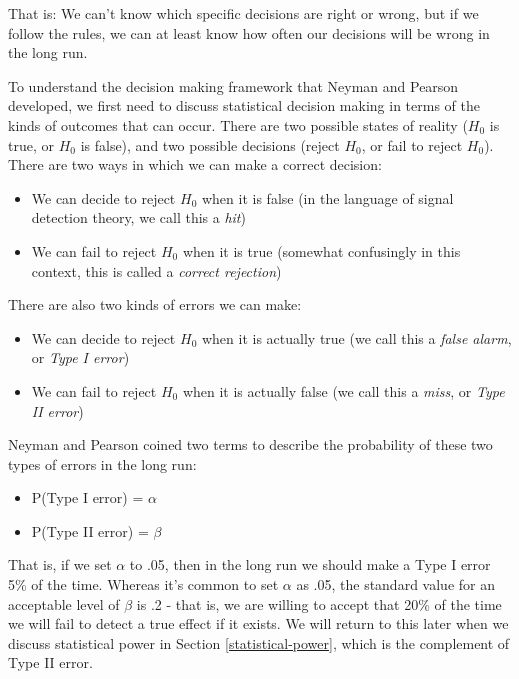 \documentclass[12pt,]{book}
\providecommand{\tightlist}{%
  \setlength{\itemsep}{0pt}\setlength{\parskip}{0pt}}
\theoremstyle{definition}
\theoremstyle{definition}
\theoremstyle{definition}
\theoremstyle{remark}
\begin{document}
That is: We can't know which specific decisions are right or wrong, but if we follow the rules, we can at least know how often our decisions will be wrong in the long run.

To understand the decision making framework that Neyman and Pearson developed, we first need to discuss statistical decision making in terms of the kinds of outcomes that can occur. There are two possible states of reality (\(H_0\) is true, or \(H_0\) is false), and two possible decisions (reject \(H_0\), or fail to reject \(H_0\)). There are two ways in which we can make a correct decision:

\begin{itemize}
\tightlist
\item
  We can decide to reject \(H_0\) when it is false (in the language of signal detection theory, we call this a \emph{hit})
\item
  We can fail to reject \(H_0\) when it is true (somewhat confusingly in this context, this is called a \emph{correct rejection})
\end{itemize}

There are also two kinds of errors we can make:

\begin{itemize}
\tightlist
\item
  We can decide to reject \(H_0\) when it is actually true (we call this a \emph{false alarm}, or \emph{Type I error})
\item
  We can fail to reject \(H_0\) when it is actually false (we call this a \emph{miss}, or \emph{Type II error})
\end{itemize}

Neyman and Pearson coined two terms to describe the probability of these two types of errors in the long run:

\begin{itemize}
\tightlist
\item
  P(Type I error) = \(\alpha\)
\item
  P(Type II error) = \(\beta\)
\end{itemize}

That is, if we set \(\alpha\) to .05, then in the long run we should make a Type I error 5\% of the time. Whereas it's common to set \(\alpha\) as .05, the standard value for an acceptable level of \(\beta\) is .2 - that is, we are willing to accept that 20\% of the time we will fail to detect a true effect if it exists. We will return to this later when we discuss statistical power in Section \ref{statistical-power}, which is the complement of Type II error.
\end{document}
